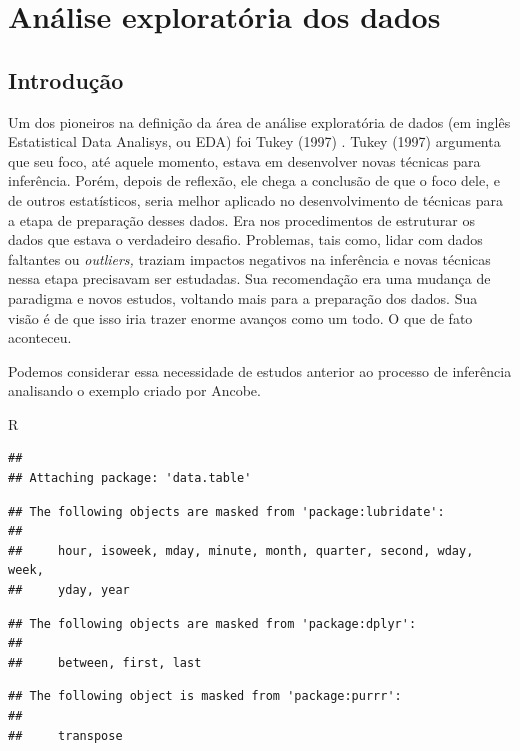 \documentclass[
]{book}
\begin{document}
\hypertarget{anuxe1lise-exploratuxf3ria-dos-dados}{%
\chapter{Análise exploratória dos dados}\label{anuxe1lise-exploratuxf3ria-dos-dados}}

\hypertarget{introduuxe7uxe3o-1}{%
\section{Introdução}\label{introduuxe7uxe3o-1}}

Um dos pioneiros na definição da área de análise exploratória de dados (em inglês Estatistical Data Analisys, ou EDA) foi Tukey (1997) \citep{tukey1977exploratory}. Tukey (1997) argumenta que seu foco, até aquele momento, estava em desenvolver novas técnicas para inferência. Porém, depois de reflexão, ele chega a conclusão de que o foco dele, e de outros estatísticos, seria melhor aplicado no desenvolvimento de técnicas para a etapa de preparação desses dados. Era nos procedimentos de estruturar os dados que estava o verdadeiro desafio. Problemas, tais como, lidar com dados faltantes ou \emph{outliers,} traziam impactos negativos na inferência e novas técnicas nessa etapa precisavam ser estudadas. Sua recomendação era uma mudança de paradigma e novos estudos, voltando mais para a preparação dos dados. Sua visão é de que isso iria trazer enorme avanços como um todo. O que de fato aconteceu.

Podemos considerar essa necessidade de estudos anterior ao processo de inferência analisando o exemplo criado por Ancobe.

R

\begin{verbatim}
## 
## Attaching package: 'data.table'
\end{verbatim}

\begin{verbatim}
## The following objects are masked from 'package:lubridate':
## 
##     hour, isoweek, mday, minute, month, quarter, second, wday, week,
##     yday, year
\end{verbatim}

\begin{verbatim}
## The following objects are masked from 'package:dplyr':
## 
##     between, first, last
\end{verbatim}

\begin{verbatim}
## The following object is masked from 'package:purrr':
## 
##     transpose
\end{verbatim}
\end{document}
